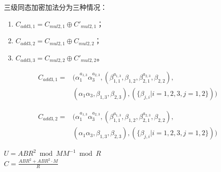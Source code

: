 \documentclass[12pt, a4paper, oneside]{ctexart}
\begin{document}
三级同态加密加法分为三种情况：
\begin{enumerate}[(1)]
    \item $C_{add3,1} = C_{mul2,1}\oplus C'_{mul2,1}$；
    \item $C_{add3,2} = C_{mul2,1}\oplus C_{mul2,2}$；
    \item $C_{add3,3} = C_{mul2,2}\oplus C'_{mul2,2}$。
\end{enumerate}
\begin{equation}
    \begin{split}
        C_{add3,1} =& (\alpha_1^{a_{1,3}}\alpha_3^{a_{2,3}},(\beta_{1,1}^{a_{1,3}},\beta_{1,2},\beta_{2,1}^{a_{2,3}},\beta_{2,2}),\\
        &(\alpha_1\alpha_3,\beta_{1,3},\beta_{2,3}),(\{\beta_{j,i}|i=1,2,3,j=1,2\}))
    \end{split}
\end{equation}


\begin{equation}
    \begin{split}
        C_{add3,2} =& (\alpha_1^{a_{1,3}}\alpha_3^{a_{2,3}},(\beta_{1,1}^{a_{1,3}},\beta_{1,2},\beta_{2,1}^{a_{2,3}},\beta_{2,2}),\\
        &(\alpha_1\alpha_3,\beta_{1,3},\beta_{2,3}),(\{\beta_{j,i}|i=1,2,3,j=1,2\}))
    \end{split}
\end{equation}

\newpage

$U = ABR^2 \bmod M M^{-1}\bmod R $\\

$C = \frac{ABR^2+ABR^2\cdot M}{R}$\\
\end{document}
